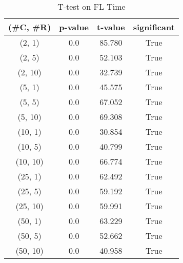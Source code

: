 \begin{table}[h]
\centering
\caption{T-test on FL Time}
\label{tab:t-testFL}
\begin{tabular}{|c|c|c|c|}
\toprule
(\#C, \#R) &  p-value &  t-value &  significant \\
\midrule
  (2, 1) &      0.0 &   85.780 &         True \\
  (2, 5) &      0.0 &   52.103 &         True \\
 (2, 10) &      0.0 &   32.739 &         True \\
  (5, 1) &      0.0 &   45.575 &         True \\
  (5, 5) &      0.0 &   67.052 &         True \\
 (5, 10) &      0.0 &   69.308 &         True \\
 (10, 1) &      0.0 &   30.854 &         True \\
 (10, 5) &      0.0 &   40.799 &         True \\
(10, 10) &      0.0 &   66.774 &         True \\
 (25, 1) &      0.0 &   62.492 &         True \\
 (25, 5) &      0.0 &   59.192 &         True \\
(25, 10) &      0.0 &   59.991 &         True \\
 (50, 1) &      0.0 &   63.229 &         True \\
 (50, 5) &      0.0 &   52.662 &         True \\
(50, 10) &      0.0 &   40.958 &         True \\
\bottomrule
\end{tabular}
\end{table}

